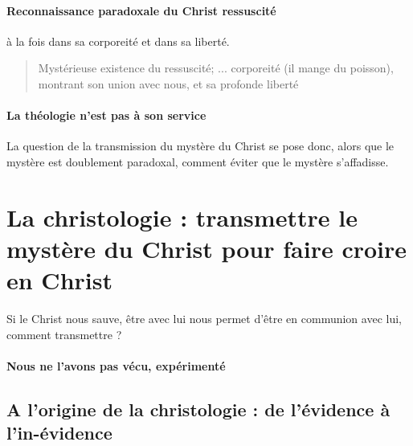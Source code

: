      \paragraph{Reconnaissance paradoxale du Christ ressuscité} à la fois dans sa corporeité et dans sa liberté.
     \begin{quote}
         Mystérieuse existence du ressuscité; ... corporeité (il mange du poisson), montrant son union avec nous, et sa profonde liberté 
     \end{quote}

    \paragraph{La théologie n'est pas à son service} La question de la transmission du mystère du Christ se pose donc, alors que le mystère est doublement paradoxal, comment éviter que le mystère s'affadisse. 
    
    
    
\section{La christologie : transmettre le mystère du Christ pour faire croire en Christ} 

  Si le Christ nous sauve, être avec lui nous permet d'être en communion avec lui, comment transmettre ?
  
  \paragraph{Nous ne l'avons pas vécu, expérimenté} 
  
    
    
\subsection{A l'origine de la christologie : de l'évidence à
    l'in-évidence}
    
  
